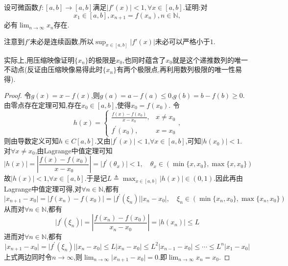 \documentclass[../../main.tex]{subfiles}%
\begin{document}
\begin{proposition}[加强的压缩映像]\label{proposition:加强的压缩映像}
设可微函数\(f:[a,b]\to[a,b]\)满足\(\vert f'(x)\vert<1,\forall x\in[a,b]\).证明:对
\[
x_1\in[a,b],x_{n + 1} = f(x_n),n\in\mathbb{N},
\]
必有\(\lim_{n \to \infty} x_n\)存在.  
\end{proposition}
\begin{remark}
注意到\(f'\)未必是连续函数,所以\(\sup_{x\in[a,b]}\vert f'(x)\vert\)未必可以严格小于\(1\).
\end{remark}
\begin{note}
实际上,用压缩映像证明$\{x_n\}$的极限是$x_0$,也同时蕴含了$x_0$就是这个递推数列的唯一不动点(反证由压缩映像易得此时$\{x_n\}$有两个极限点,再利用数列极限的唯一性易得).
\end{note}
\begin{proof}
令\(g(x)=x - f(x)\),则\(g(a)=a - f(a)\leqslant0\),\(g(b)=b - f(b)\geqslant0\).由零点存在定理可知,存在\(x_0\in[a,b]\),使得\(x_0 = f(x_0)\).
令\[h(x)=\begin{cases}
\frac{f(x) - f(x_0)}{x - x_0},&x\neq x_0\\
f^\prime(x_0),&x = x_0
\end{cases},\]则由导数定义可知\(h\in C[a,b]\).又由\(\vert f^\prime(x)\vert<1\),\(\forall x\in[a,b]\),可知\(\vert h(x_0)\vert<1\).
对\(\forall x\neq x_0\),由Lagrange中值定理可知
\[
\vert h(x)\vert=\left\vert\frac{f(x) - f(x_0)}{x - x_0}\right\vert=\vert f^\prime(\theta_x)\vert<1,\quad\theta_x\in(\min\{x,x_0\},\max\{x,x_0\})
\]
故\(\vert h(x)\vert<1\),\(\forall x\in[a,b]\).于是记\(L\triangleq\max_{x\in[a,b]}\vert h(x)\vert\in(0,1)\).因此再由Lagrange中值定理可得,对\(\forall n\in\mathbb{N}\),都有
\[
\vert x_{n + 1}-x_0\vert=\vert f(x_n) - f(x_0)\vert=\vert f^\prime(\xi_n)\vert\vert x_n - x_0\vert,\quad\xi_n\in(\min\{x_n,x_0\},\max\{x_n,x_0\})
\]
从而对\(\forall n\in\mathbb{N}\),都有
\[
\vert f^\prime(\xi_n)\vert=\left\vert\frac{f(x_n) - f(x_0)}{x_n - x_0}\right\vert=\vert h(x_n)\vert\leqslant L
\]
进而对\(\forall n\in\mathbb{N}\),都有
\[
\vert x_{n + 1}-x_0\vert=\vert f^\prime(\xi_n)\vert\vert x_n - x_0\vert\leqslant L\vert x_n - x_0\vert\leqslant L^2\vert x_{n - 1}-x_0\vert\leqslant\cdots\leqslant L^n\vert x_1 - x_0\vert
\]
上式两边同时令\(n\rightarrow\infty\),则\(\lim_{n\rightarrow\infty}\vert x_{n + 1}-x_0\vert = 0\).即\(\lim_{n\rightarrow\infty}x_n = x_0\).
\end{proof}
\end{document}
